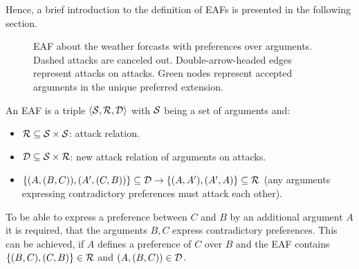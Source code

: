 Hence, a brief introduction to the definition of \glspl{EAF} is presented in the following section.
\begin{figure}[b!]
\centering
{}
\caption{\gls{EAF} about the weather forcasts with preferences over arguments. Dashed attacks are canceled out. Double-arrow-headed edges represent attacks on attacks. Green nodes represent accepted arguments in the unique preferred extension.}
\label{fig:eaf_intro}
\end{figure}


\begin{definition}
	An \gls{EAF} is a triple $\langle \S, \R, \D \rangle$ with $\S$ being a set of arguments and:
	\begin{itemize}
		\item $\R \subseteq \S \times \S$: attack relation.
		\item $\D \subseteq \S \times \R$: new attack relation of arguments on attacks.
		\item $\{(A, (B, C)), (A', (C, B))\} \subseteq \D \rightarrow \{(A, A'), (A', A)\} \subseteq \R$ (any arguments expressing contradictory preferences must attack each other).
	\end{itemize}
\end{definition}

\begin{remark}
To be able to express a preference between $C$ and $B$ by an additional argument $A$ it is required, that the arguments $B, C$ express contradictory preferences. This can be achieved, if $A$ defines a preference of $C$ over $B$ and the \gls{EAF} contains $\{(B, C), (C, B)\} \in \R$ and $(A, (B, C)) \in \D$. 
\end{remark}

